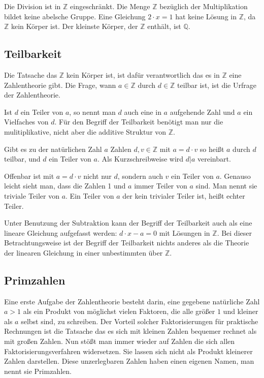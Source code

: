 \documentclass[10pt, bigheadings]{scrartcl}
\begin{document}
Die Division ist in ${\mathbb Z}$ eingeschränkt. Die Menge ${\mathbb Z}$
bezüglich der Multiplikation bildet keine abelsche Gruppe. Eine
Gleichung $2\cdot x = 1$ hat keine Lösung in ${\mathbb Z}$, da ${\mathbb Z}$
kein Körper ist. Der kleinste Körper, der ${\mathbb Z}$ enthält, ist
${\mathbb Q}$.

\subsection{Teilbarkeit}
Die Tatsache das ${\mathbb Z}$ kein Körper ist, ist dafür verantwortlich
das es in ${\mathbb Z}$ eine Zahlentheorie gibt. Die Frage, wann
$a \in {\mathbb Z}$ durch $d \in {\mathbb Z}$ teilbar ist, ist die Urfrage
der Zahlentheorie.

Ist $d$ ein Teiler von $a$, so nennt man $d$ auch eine in $a$ aufgehende
Zahl und $a$ ein Vielfaches von $d$. Für den Begriff der Teilbarkeit
benötigt man nur die mulitiplikative, nicht aber die additive Struktur
von ${\mathbb Z}$.

Gibt es zu der natürlichen Zahl $a$ Zahlen $d, v \in {\mathbb Z}$ mit
$a = d\cdot v$ so heißt $a$ durch $d$ teilbar, und $d$ ein Teiler von $a$. Als
Kurzschreibweise wird $d|a$ vereinbart.

Offenbar ist mit $a = d\cdot v$ nicht nur $d$, sondern auch $v$ ein Teiler von
$a$. Genauso leicht sieht man, dass die Zahlen 1 und $a$ immer Teiler von
$a$ sind. Man nennt sie triviale Teiler von $a$. Ein Teiler von $a$ der
kein trivialer Teiler ist, heißt echter Teiler.

Unter Benutzung der Subtraktion kann der Begriff der Teilbarkeit auch als
eine lineare Gleichung aufgefasst werden: $d\cdot x - a = 0$ mit Lösungen in
${\mathbb Z}$. Bei dieser Betrachtungsweise ist der Begriff der Teilbarkeit
nichts anderes als die Theorie der linearen Gleichung in einer unbestimmten
über ${\mathbb Z}$.

\subsection{Primzahlen}
Eine erste Aufgabe der Zahlentheorie besteht darin, eine gegebene natürliche
Zahl $a>1$ als ein Produkt von möglichst vielen Faktoren, die alle größer $1$
und kleiner als $a$ selbst sind, zu schreiben. Der Vorteil solcher
Faktorisierungen für praktische Rechnungen ist die Tatsache das es sich mit
kleinen Zahlen bequemer rechnet als mit großen Zahlen. Nun stößt man immer
wieder auf Zahlen die sich allen Faktorisierungsverfahren widersetzen. Sie
lassen sich nicht als Produkt kleinerer Zahlen darstellen. Diese unzerlegbaren
Zahlen haben einen eigenen Namen, man nennt sie Primzahlen.
\end{document}
